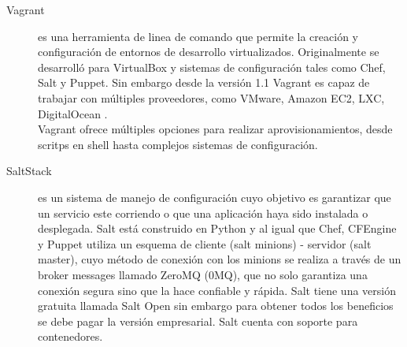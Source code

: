 \begin{description}
\item [Vagrant]
 es una herramienta de linea de comando que permite la creación y configuración de entornos de desarrollo virtualizados. Originalmente se desarrolló para VirtualBox y sistemas de configuración tales como Chef, Salt y Puppet. Sin embargo desde la versión 1.1 Vagrant es capaz de trabajar con múltiples proveedores, como VMware, Amazon EC2, LXC, DigitalOcean \cite{Vag15}.
\\
Vagrant ofrece múltiples opciones para realizar aprovisionamientos, desde scritps en shell hasta complejos sistemas de configuración.

\item [SaltStack]
 es un sistema de manejo de configuración cuyo objetivo es garantizar que un servicio este corriendo o que una aplicación haya sido instalada o desplegada. Salt está construido en Python y al igual que Chef, CFEngine y Puppet utiliza un esquema de cliente (salt minions) - servidor (salt master), cuyo método de conexión con los minions se realiza a través de un broker messages llamado ZeroMQ (0MQ), que no solo garantiza una conexión segura sino que la hace confiable y rápida. Salt tiene una versión gratuita llamada Salt Open sin embargo para obtener todos los beneficios se debe pagar la versión empresarial. Salt cuenta con soporte para contenedores. \cite{Salt15}

\end{description}
